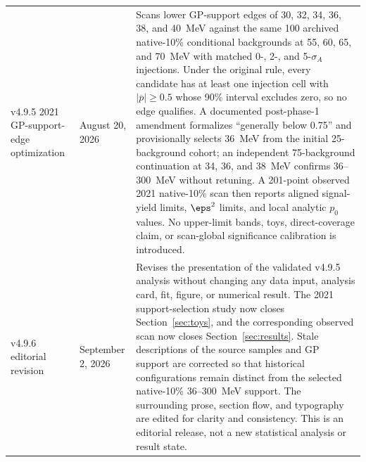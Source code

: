 \begin{longtable}{P{0.11\textwidth}P{0.16\textwidth}P{0.64\textwidth}}
\addlinespace
v4.9.5 2021 GP-support-edge optimization & August 20, 2026 &
Scans lower GP-support edges of 30, 32, 34, 36, 38, and 40~MeV against the same 100
archived native-10\% conditional backgrounds at 55, 60, 65, and 70~MeV with matched
0-, 2-, and 5-$\sigma_A$ injections.  Under the original rule, every candidate has
at least one injection cell with $|\overline p|\geq0.5$ whose 90\% interval excludes
zero, so no edge qualifies.  A documented post-phase-1 amendment
formalizes ``generally below 0.75'' and provisionally selects 36~MeV from the initial
25-background cohort; an independent 75-background continuation at 34, 36, and
38~MeV confirms 36--300~MeV without retuning.  A 201-point observed 2021 native-10\%
scan then reports aligned signal-yield limits, $\eps^2$ limits, and local analytic
$p_0$ values.  No upper-limit bands, \CLs{} toys, direct-coverage claim, or
scan-global significance calibration is introduced. \\
\addlinespace
v4.9.6 editorial revision & September 2, 2026 &
Revises the presentation of the validated v4.9.5 analysis without changing any data
input, analysis card, fit, figure, or numerical result.  The 2021 support-selection
study now closes Section~\ref{sec:toys}, and the corresponding observed scan now
closes Section~\ref{sec:results}.  Stale descriptions of the source samples and GP
support are corrected so that historical configurations remain distinct from the
selected native-10\% 36--300~MeV support.  The surrounding prose, section flow, and
typography are edited for clarity and consistency.  This is an editorial release,
not a new statistical analysis or result state. \\
\end{longtable}
\endgroup
